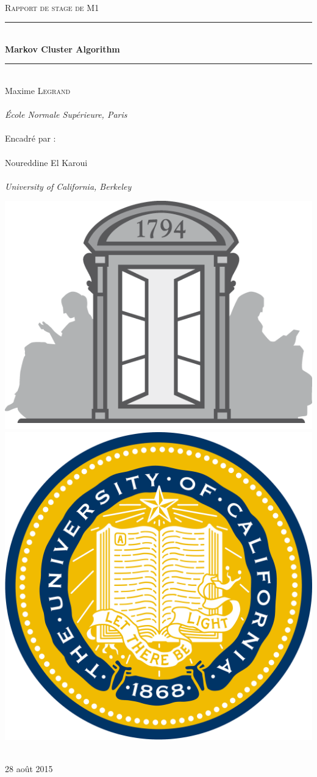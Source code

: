 \documentclass[12pt,a4paper]{report}
\newcommand{\HRule}{\rule{\linewidth}{0.5mm}}
\begin{document}

\begin{titlepage}
\begin{center}

~\\[1.5cm]
\textsc{\Large Rapport de stage de M1}\\[0.5cm]

\HRule \\[0.4cm]
{ \huge \bfseries Markov Cluster Algorithm\\[0.4cm] }

\HRule \\[1.5cm]

{\large Maxime \textsc{Legrand}}\\
~\\
{\large \emph{École Normale Supérieure, Paris}}\\
~\\[1cm]
{\large Encadré par :}\\
~\\
{\large Noureddine El Karoui}\\
~\\
{\large \emph{University of California, Berkeley}}\\

\vfill

\includegraphics[height=0.3\textwidth]{images/logoens.png} \hspace{2.5cm}
\includegraphics[height=0.3\textwidth]{images/logoucb.jpg}~\\

\vfill

{\large 28 août 2015}
\end{center}
\end{titlepage}
\end{document}
